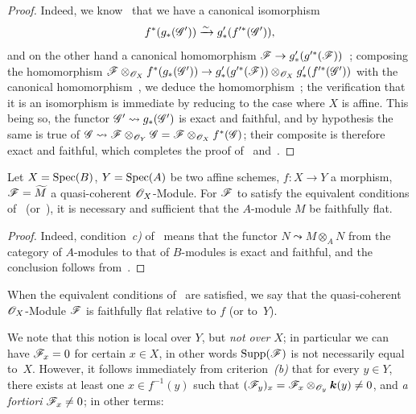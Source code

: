 \begin{proof}
Indeed, we know~ that we have a canonical isomorphism
\[
  f^*(g_*(\mathscr{G}'))\xrightarrow{\sim} g'_*(f'^*(\mathscr{G}')),
\]
and on the other hand a canonical homomorphism $\mathscr{F}\to g'_*(g'^*(\mathscr{F}))$~; composing the homomorphism $\mathscr{F}\otimes_{\mathscr{O}_X}f^*(g_*(\mathscr{G}'))\to g'_*(g'^*(\mathscr{F}))\otimes_{\mathscr{O}_X}g'_*(f'^*(\mathscr{G}'))$ with the canonical homomorphism~, we deduce the homomorphism~; the verification that it is an isomorphism is immediate by reducing to the case where $X$ is affine.
This being so, the functor $\mathscr{G}'\leadsto g_*(\mathscr{G}')$ is exact and faithful, and by hypothesis the same is true of $\mathscr{G}\leadsto\mathscr{F}\otimes_{\mathscr{O}_Y}\mathscr{G}=\mathscr{F}\otimes_{\mathscr{O}_X}f^*(\mathscr{G})$; their composite is therefore exact and faithful, which completes the proof of~ and~.
\end{proof}

\begin{corollary}[2.2.3]
\label{IV.2.2.3}
Let $X=\operatorname{Spec}(B)$, $Y=\operatorname{Spec}(A)$ be two affine schemes, $f:X\to Y$ a morphism, $\mathscr{F}=\widetilde{M}$ a quasi-coherent $\mathscr{O}_X$-Module.
For $\mathscr{F}$ to satisfy the equivalent conditions of~ \textnormal{(}or~\textnormal{)}, it is necessary and sufficient that the $A$-module $M$ be faithfully flat.
\end{corollary}

\begin{proof}
Indeed, condition~\emph{c)} of~ means that the functor $N\leadsto M\otimes_A N$ from the category of $A$-modules to that of $B$-modules is exact and faithful, and the conclusion follows from~.
\end{proof}

\begin{definition}[2.2.4]
\label{IV.2.2.4}
When the equivalent conditions of~ are satisfied, we say that the quasi-coherent $\mathscr{O}_X$-Module $\mathscr{F}$ is faithfully flat relative to $f$ (or to~$Y$).
\end{definition}

We note that this notion is local over $Y$, but \emph{not over} $X$; in particular we can have $\mathscr{F}_x=0$ for certain $x\in X$, in other words $\operatorname{Supp}(\mathscr{F})$ is not necessarily equal to~$X$.
However, it follows immediately from criterion~\emph{(b)} that for every $y\in Y$, there exists at least one $x\in f^{-1}(y)$ such that $(\mathscr{F}_y)_x=\mathscr{F}_x\otimes_{\mathscr{O}_y}\boldsymbol{k}(y)\neq 0$, and \emph{a fortiori} $\mathscr{F}_x\neq 0$; in other terms:

